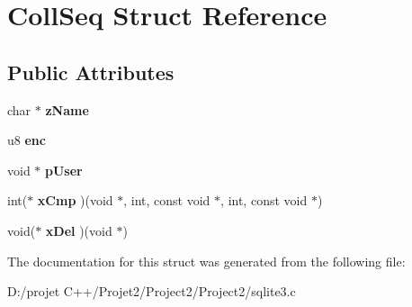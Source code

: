 \hypertarget{struct_coll_seq}{}\section{Coll\+Seq Struct Reference}
\label{struct_coll_seq}
\subsection*{Public Attributes}
\begin{DoxyCompactItemize}
\item 
\mbox{\label{struct_coll_seq_a48d6d5f71d4f8a3ab122903464e8b4a1}} 
char $\ast$ {\bfseries z\+Name}
\item 
\mbox{\label{struct_coll_seq_add27da1a70ed6f538447e9183eeb4838}} 
u8 {\bfseries enc}
\item 
\mbox{\label{struct_coll_seq_a3cee924d41e730ccec7f686eb5b6f041}} 
void $\ast$ {\bfseries p\+User}
\item 
\mbox{\label{struct_coll_seq_a3f5a0c7eb4da9d8e396138719210f580}} 
int($\ast$ {\bfseries x\+Cmp} )(void $\ast$, int, const void $\ast$, int, const void $\ast$)
\item 
\mbox{\label{struct_coll_seq_a92c8da8b4021953e5bdc0fd9af077f1f}} 
void($\ast$ {\bfseries x\+Del} )(void $\ast$)
\end{DoxyCompactItemize}


The documentation for this struct was generated from the following file\+:\begin{DoxyCompactItemize}
\item 
D\+:/projet C++/\+Projet2/\+Project2/\+Project2/sqlite3.\+c\end{DoxyCompactItemize}
